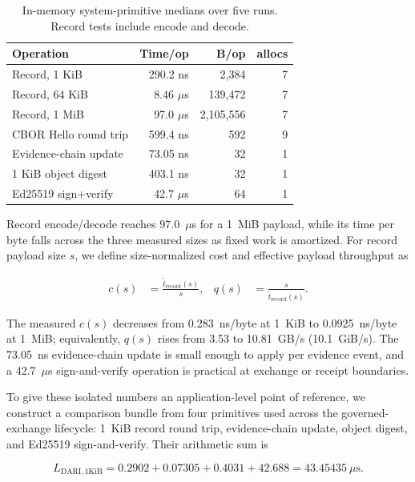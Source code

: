 \documentclass[10pt]{article}
\begin{document}
\begin{table}[t]
\centering
\caption{In-memory system-primitive medians over five runs. Record tests include encode and decode.}
\label{tab:microbench}
\small
\begin{tabular}{@{}l r r r@{}}
\toprule
Operation & Time/op & B/op & allocs \\
\midrule
Record, 1 KiB & 290.2 ns & 2,384 & 7 \\
Record, 64 KiB & 8.46 $\mu$s & 139,472 & 7 \\
Record, 1 MiB & 97.0 $\mu$s & 2,105,556 & 7 \\
CBOR Hello round trip & 599.4 ns & 592 & 9 \\
Evidence-chain update & 73.05 ns & 32 & 1 \\
1 KiB object digest & 403.1 ns & 32 & 1 \\
Ed25519 sign+verify & 42.7 $\mu$s & 64 & 1 \\
\bottomrule
\end{tabular}
\end{table}

Record encode/decode reaches 97.0~$\mu$s for a 1~MiB payload, while its time per byte falls across the three measured sizes as fixed work is amortized. For record payload size $s$, we define size-normalized cost and effective payload throughput as

\begin{align}
c(s) &= \frac{\widetilde{t}_{\mathrm{record}}(s)}{s},
  & q(s) &= \frac{s}{\widetilde{t}_{\mathrm{record}}(s)}.
\label{eq:normalized}
\end{align}

The measured $c(s)$ decreases from 0.283~ns/byte at 1~KiB to 0.0925~ns/byte at 1~MiB; equivalently, $q(s)$ rises from 3.53 to 10.81~GB/s (10.1~GiB/s). The 73.05~ns evidence-chain update is small enough to apply per evidence event, and a 42.7~$\mu$s sign-and-verify operation is practical at exchange or receipt boundaries.

To give these isolated numbers an application-level point of reference, we construct a comparison bundle from four primitives used across the governed-exchange lifecycle: 1~KiB record round trip, evidence-chain update, object digest, and Ed25519 sign-and-verify. Their arithmetic sum is

\begin{equation}
L_{\mathrm{DARI},1\mathrm{KiB}}
= 0.2902 + 0.07305 + 0.4031 + 42.688
= 43.45435~\mu\mathrm{s}.
\label{eq:interactive-budget}
\end{equation}
\end{document}
